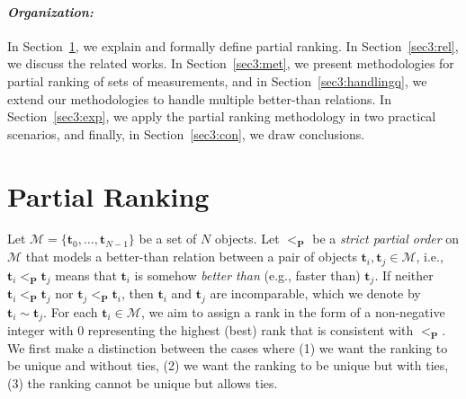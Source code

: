 \documentclass[acmsmall,screen, review]{acmart}
\begin{document}
\paragraph{\textit{Organization: }} In Section~\ref{sec3:def}, we explain and formally define partial ranking. In Section~\ref{sec3:rel}, we discuss the related works. In Section~\ref{sec3:met}, we present methodologies for partial ranking of sets of measurements, and in Section~\ref{sec3:handlingq}, we extend our methodologies to handle multiple better-than relations. In Section~\ref{sec3:exp}, we apply the partial ranking methodology in two practical scenarios, and finally, in Section~\ref{sec3:con}, we draw conclusions.





\section{Partial Ranking}
\label{sec3:def}

Let $\mathcal{M} = \{\mathbf{t}_0, \dots, \mathbf{t}_{N-1}\}$ be a set of $N$ objects. Let $<_{\mathbf{P}} $ be a \textit{strict partial order} on $\mathcal{M}$ that models a better-than relation
between a pair of objects  $\mathbf{t}_i, \mathbf{t}_j \in \mathcal{M}$, i.e.,  $\mathbf{t}_i <_{\mathbf{P}}  \mathbf{t}_j$  means that $\mathbf{t}_i$ is somehow\textit{ better than} (e.g., faster than) $\mathbf{t}_j$. If  neither $\mathbf{t}_i <_{\mathbf{P}}  \mathbf{t}_j$ nor  $\mathbf{t}_j <_{\mathbf{P}}  \mathbf{t}_i$, then $\mathbf{t}_i$ and $\mathbf{t}_j$ are incomparable, which we denote by  $\mathbf{t}_i \sim \mathbf{t}_j$.
For each $\mathbf{t}_i \in \mathcal{M}$, we aim to assign a rank in the form of a non-negative integer with 0 representing the highest (best) rank that is consistent with $<_{\mathbf{P}} $. 
We first make a distinction between the cases where (1) we want the ranking to be unique and without ties, (2) we want the ranking to be unique but with ties, (3) the ranking cannot be unique but allows ties. 
\end{document}
